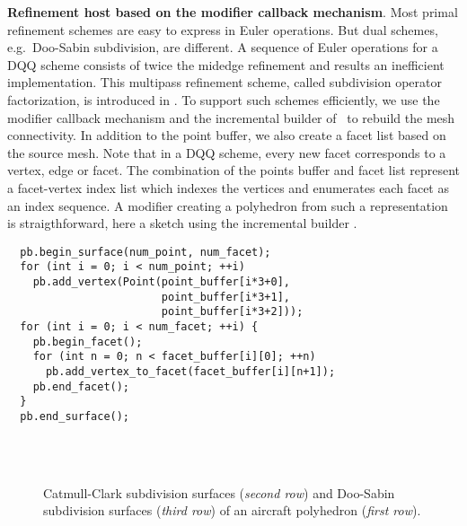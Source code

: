\noindent\textbf{Refinement host based on the modifier callback mechanism}.
Most primal refinement schemes are easy to express in Euler
operations. But dual schemes, e.g.\ Doo-Sabin subdivision, are
different. A sequence of Euler operations for a DQQ scheme consists of
twice the midedge refinement \cite{Peters:1997:SSS} and results
an inefficient implementation. This multipass refinement scheme,
called subdivision operator factorization, is introduced in
\cite{Peter:2003:CPDSS}.  To support such schemes efficiently, we use
the modifier callback mechanism and the incremental builder of
\cgalpoly\ to rebuild the mesh connectivity. In addition to the point
buffer, we also create a facet list based on the source mesh. Note
that in a DQQ scheme, every new facet corresponds to a vertex, edge or
facet. The combination of the points buffer and facet list represent a
facet-vertex index list which indexes the vertices and enumerates each
facet as an index sequence. A modifier creating a polyhedron from such
a representation is straigthforward, here a sketch using the
incremental builder .
\begin{lstlisting}
  pb.begin_surface(num_point, num_facet);
  for (int i = 0; i < num_point; ++i) 
    pb.add_vertex(Point(point_buffer[i*3+0], 
                        point_buffer[i*3+1], 
                        point_buffer[i*3+2]));        
  for (int i = 0; i < num_facet; ++i) {
    pb.begin_facet();
    for (int n = 0; n < facet_buffer[i][0]; ++n)
      pb.add_vertex_to_facet(facet_buffer[i][n+1]);
    pb.end_facet();
  }
  pb.end_surface();
\end{lstlisting}\vspace*{-3mm}

\begin{figure}
  \centering
   \\
  \\
  \caption{Catmull-Clark subdivision surfaces ({\itshape second row}) and
  Doo-Sabin subdivision surfaces ({\itshape third row}) 
  of an aircraft polyhedron ({\itshape first row}).
  }
  \label{fig:SubExample}\vspace*{-2mm}
\end{figure}

